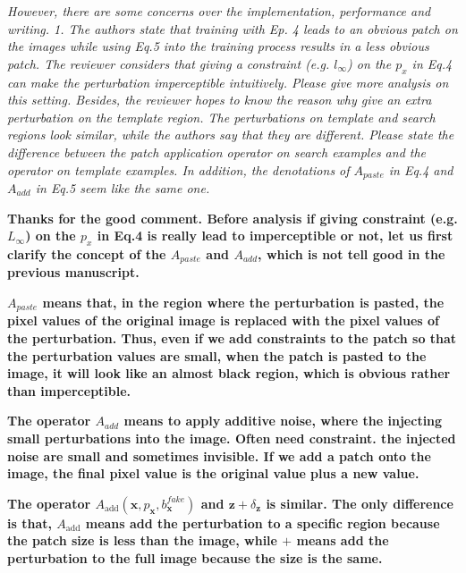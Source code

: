 \documentclass[12pt]{article}
\begin{document}
\textit{However, there are some concerns over the implementation, performance and writing. 1. The authors state that training with Ep. 4 leads to an obvious patch on the images while using Eq.5 into the training process results in a less obvious patch. The reviewer considers that giving a constraint (e.g. $l_{\infty}$) on the $p_x$ in Eq.4 can make the perturbation imperceptible intuitively. Please give more analysis on this setting.
Besides, the reviewer hopes to know the reason why give an extra perturbation on the template region. The perturbations on template and search regions look similar, while the authors say that they are different. Please state the difference between the patch application operator on search examples and the operator on template examples.
In addition, the denotations of $A_{paste}$ in Eq.4 and $A_{add}$ in Eq.5 seem like the same one.
}

\textbf{
Thanks for the good comment.
Before analysis if giving constraint (e.g. $L_{\infty}$) on the $p_x$ in Eq.4 is really lead to imperceptible or not, let us first clarify the concept of the $A_{paste}$ and $A_{add}$, which is not tell good in the previous manuscript.}

\textbf{%
$A_{paste}$ means that,
in the region where the perturbation is pasted, the pixel values of the original image is replaced with the pixel values of the perturbation.
Thus, even if we add constraints to the patch so that the perturbation values are small, when the patch is pasted to the image, it will look like an almost black region, which is obvious rather than imperceptible.
}

\textbf{
The operator $A_{add}$ means to apply additive noise, where the injecting small perturbations into the image. Often need constraint. the injected noise are small and sometimes invisible. If we add a patch onto the image, the final pixel value is the original value plus a new value.}

\textbf{The operator $A_{\text{add}}(\textbf{x}, p_\textbf{x}, b^{fake}_{\textbf{x}})$ and $\textbf{z} + \delta_\textbf{z}$ is similar. The only difference is that, $A_{\text{add}}$ means add the perturbation to a specific region because the patch size is less than the image, while $+$ means add the perturbation to the full image because the size is the same.}
\end{document}
